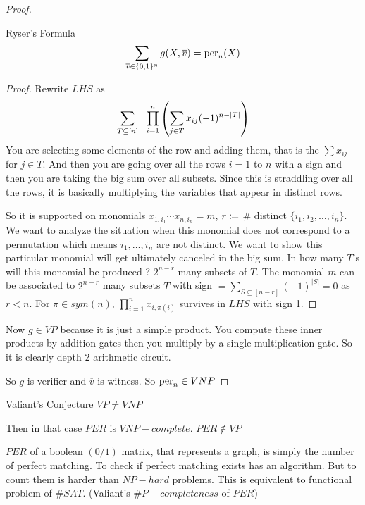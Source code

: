 \documentclass{report}
\begin{document}
{\begin{proof}
	\begin{claim}{Ryser's Formula \cite{ryser1963combinatorial}}{}
		$$\sum\limits_{\overline{v}\in \{0,1\}^n} g(X,\overline{v})=\text{per}_n(X)$$
	\end{claim}
\begin{proof}
	Rewrite $LHS$ as $$\sum_{T\subseteq [n]}\ \  \prod_{i=1}^n\lt(  \sum_{j\in T }x_{ij}(-1)^{n-|T|} \rt)$$
	You are selecting some elements of the row and adding them, that is the $\sum x_{ij}$ for $j\in T$. And then you are going over all the rows $i=1$ to $n$ with a sign and then you are taking the big sum over all subsets. Since this is straddling over all the rows, it is basically multiplying the variables that appear in distinct rows.
	
	So it is supported on monomials $x_{1,i_1}\cdots x_{n,i_n}=m$, $r\coloneqq $ \# distinct $\{i_1,i_2,\dots, i_n\}$. We want to analyze the situation when this monomial does not correspond to a permutation which means $i_1,\dots,i_n$ are not distinct. We want to show this particular monomial will get ultimately canceled in the big sum. In how many $T$'s will this monomial  be produced ? $2^{n-r}$ many subsets of $T$. The monomial $m$ can be associated to $2^{n-r}$ many subsets $T$ with sign $=\sum\limits_{S\subseteq [n-r]} (-1)^{|S|}=0$ as $r<n$. For $\pi\in sym(n)$, $\prod\limits_{i=1}^n x_{i,\pi(i)}$ survives in $LHS$ with sign 1.
\end{proof}

Now $g\in VP$ because it is just a simple product. You compute these inner products by addition gates then you multiply by a single multiplication gate. So it is clearly depth 2 arithmetic circuit.

So $g$ is verifier and $\overline{v}$ is witness. So $\text{per}_n\in VNP$
\end{proof}

\begin{conjecture}{Valiant's Conjecture}{}
	$VP\neq VNP$
\end{conjecture}
Then in that case $PER$ is $VNP-complete.$ $PER\notin VP$
\parinn

$PER$ of a boolean $(0/1)$ matrix, that represents a graph, is simply the number of perfect matching. To check if perfect matching exists has an algorithm. But to count them is harder than $NP-hard$ problems. This is equivalent to functional problem of $\#SAT$. (Valiant's $\#P-completeness$ of $PER$)

 
}
\end{document}
